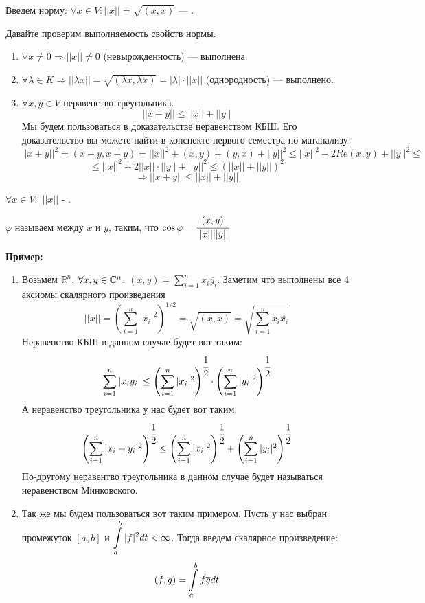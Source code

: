  Введем норму: $\forall x \in V: ||x|| =\sqrt{(x,x)}$ --- .

Давайте проверим выполняемость свойств нормы.

\begin{enumerate} %
    \item $\forall x \neq 0 \Rightarrow ||x|| \neq 0$ (невырожденность) --- выполнена.
    \item  $\forall \lambda \in K \Rightarrow ||\lambda x|| = \sqrt{(\lambda x, \lambda x)} = |\lambda|\cdot||x||$ (однородность) --- выполнено.
    \item  $\forall x, y\in V$ неравенство треугольника. 
    $$||x+y||\leq ||x|| + ||y||$$
    Мы будем пользоваться в доказательстве неравенством КБШ. Его доказательство вы можете найти в конспекте первого семестра по матанализу. 
    $$||x+y||^2 = (x+y,x+y) = ||x||^2 + (x,y) + (y,x) + ||y||^2 \leq ||x||^2 + 2 Re(x,y) + ||y||^2 \leq$$
    $$\leq ||x||^2 + 2||x||\cdot||y|| + ||y||^2 \leq  (||x|| + ||y||)^2$$
    $$\Rightarrow ||x+y|| \leq ||x|| + ||y||$$
\end{enumerate} 

  $\forall x \in V:$ $||x||$ - . 

 $\varphi$ называем  между $x$ и $y$, таким, что $\cos \varphi = \cfrac{(x,y)}{||x||||y||}$

\textbf{Пример:}

\begin{enumerate}
    \item Возьмем $\mathbb{R}^n$. $\forall x,y \in \mathbb{C}^n$. $(x,y) = \sum\limits_{i=1}^n x_i \overline{y_i}$. Заметим что выполнены все 4 аксиомы скалярного произведения
    $$||x|| = (\sum\limits_{i=1}^n |x_i|^2)^{1/2} = \sqrt{(x,x)} = \sqrt{\sum\limits_{i=1}^n x_i \overline{x_i}}$$
    Неравенство КБШ в данном случае будет вот таким:
    $$\sum\limits_{i=1}^n |x_iy_i| \leq \left(\sum\limits_{i=1}^n |x_i|^2\right)^{\cfrac{1}{2}} \cdot \left ( \sum\limits_{i=1}^{n} |y_i|^2\right)^{\cfrac{1}{2}}$$
    А неравенство треугольника у нас будет вот таким:
    $$\left(\sum\limits_{i=1}^n|x_i+y_i|^2\right)^{\cfrac{1}{2}}\leq \left(\sum\limits_{i=1}^n|x_i|^2\right) ^{\cfrac{1}{2}} + \left(\sum\limits_{i=1}^n |y_i|^2\right)^{\cfrac{1}{2}}$$
    По-другому неравентво треугольника в данном случае будет называться неравенством Минковского.
    \item Так же мы будем пользоваться вот таким примером. Пусть у нас выбран промежуток $[a,b]$ и $\displaystyle\int\limits_{a}^{b}|f|^2dt < \infty$. Тогда введем скалярное произведение: 
    $$(f,g) = \displaystyle\int\limits_{a}^{b} f \overline{g}dt$$
\end{enumerate}

